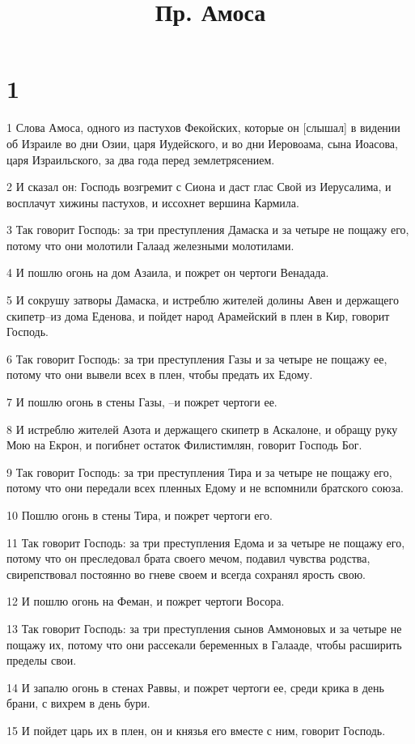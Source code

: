 

\title{Пр. Амоса}


\chapter{1}

\par 1 Слова Амоса, одного из пастухов Фекойских, которые он [слышал] в видении об Израиле во дни Озии, царя Иудейского, и во дни Иеровоама, сына Иоасова, царя Израильского, за два года перед землетрясением.
\par 2 И сказал он: Господь возгремит с Сиона и даст глас Свой из Иерусалима, и восплачут хижины пастухов, и иссохнет вершина Кармила.
\par 3 Так говорит Господь: за три преступления Дамаска и за четыре не пощажу его, потому что они молотили Галаад железными молотилами.
\par 4 И пошлю огонь на дом Азаила, и пожрет он чертоги Венадада.
\par 5 И сокрушу затворы Дамаска, и истреблю жителей долины Авен и держащего скипетр--из дома Еденова, и пойдет народ Арамейский в плен в Кир, говорит Господь.
\par 6 Так говорит Господь: за три преступления Газы и за четыре не пощажу ее, потому что они вывели всех в плен, чтобы предать их Едому.
\par 7 И пошлю огонь в стены Газы, --и пожрет чертоги ее.
\par 8 И истреблю жителей Азота и держащего скипетр в Аскалоне, и обращу руку Мою на Екрон, и погибнет остаток Филистимлян, говорит Господь Бог.
\par 9 Так говорит Господь: за три преступления Тира и за четыре не пощажу его, потому что они передали всех пленных Едому и не вспомнили братского союза.
\par 10 Пошлю огонь в стены Тира, и пожрет чертоги его.
\par 11 Так говорит Господь: за три преступления Едома и за четыре не пощажу его, потому что он преследовал брата своего мечом, подавил чувства родства, свирепствовал постоянно во гневе своем и всегда сохранял ярость свою.
\par 12 И пошлю огонь на Феман, и пожрет чертоги Восора.
\par 13 Так говорит Господь: за три преступления сынов Аммоновых и за четыре не пощажу их, потому что они рассекали беременных в Галааде, чтобы расширить пределы свои.
\par 14 И запалю огонь в стенах Раввы, и пожрет чертоги ее, среди крика в день брани, с вихрем в день бури.
\par 15 И пойдет царь их в плен, он и князья его вместе с ним, говорит Господь.

